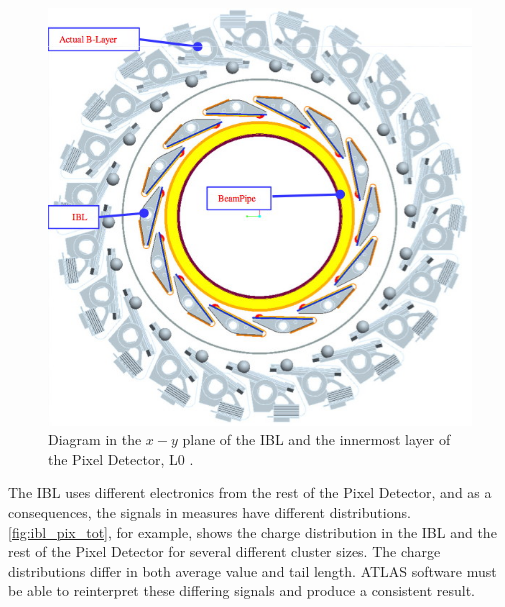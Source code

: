 \begin{centering}
\begin{figure}[!htb]
\myfloatalign
\includegraphics[width=.90\linewidth]{figures/atlas/IBL-other.png}
\caption{Diagram in the $x-y$ plane of the \ac{IBL} and the innermost layer of the Pixel Detector, L0 \cite{1201.5469}.}
\label{fig:ibl_add}
\end{figure}
\end{centering}

The \ac{IBL} uses different electronics from the rest of the Pixel Detector, and as a consequences, the signals in measures have different distributions. \autoref{fig:ibl_pix_tot}, for example, shows the charge distribution in the \ac{IBL} and the rest of the Pixel Detector for several different cluster sizes. The charge distributions differ in both average value and tail length. \ac{ATLAS} software must be able to reinterpret these differing signals and produce a consistent result. 

